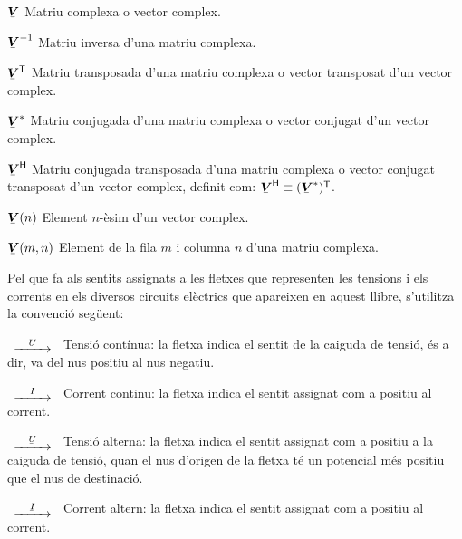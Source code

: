 \begin{list}{}
    \item[$\mcmplx{V}$] Matriu complexa o  vector complex.
    \item[$\mcmplx{V}^{-1}$] Matriu inversa d'una matriu complexa.
    \item[$\transp{\mcmplx{V}}$] Matriu transposada d'una matriu complexa o vector
    transposat d'un vector complex.
    \item[$\mcmplx{V}^*$] Matriu conjugada d'una matriu complexa o vector
    conjugat d'un vector complex.
    \item[$\hermit{V}$] Matriu conjugada transposada d'una matriu complexa o vector
    conjugat transposat d'un vector complex, definit com: $\hermit{V} \equiv
    \transp{(\mcmplx{V}^*)}$.
    \item[$\mcmplx{V}(n)$] Element $n$-èsim d'un vector complex.
    \item[$\mcmplx{V}(m,n)$] Element de la fila $m$ i columna $n$ d'una matriu complexa.
\end{list}

Pel que fa als sentits assignats a les fletxes que representen les
tensions i els corrents en els diversos circuits elèctrics que
apareixen en aquest llibre, s'utilitza la convenció següent:

\begin{list}{}
{\setlength{\labelwidth}{15mm} \setlength{\leftmargin}{20mm}
\setlength{\labelsep}{5mm}}
    \item[$\begin{CD} @>U>> \end{CD}$] Tensió contínua: la fletxa indica el sentit
    de la caiguda de tensió, és a dir, va del nus positiu al nus negatiu.
    \item[$\begin{CD} @>I>> \end{CD}$] Corrent
    continu: la fletxa indica el sentit  assignat com a positiu al corrent.
    \item[$\begin{CD} @>\cmplx{U}>> \end{CD}$] Tensió alterna: la fletxa indica el
    sentit assignat com a positiu a la caiguda de tensió, quan el nus d'origen de la fletxa
    té un potencial  més positiu que el nus de destinació.
    \item[$\begin{CD} @>\cmplx{I}>> \end{CD}$] Corrent altern: la fletxa
    indica el sentit  assignat com a positiu al corrent.
\end{list}

